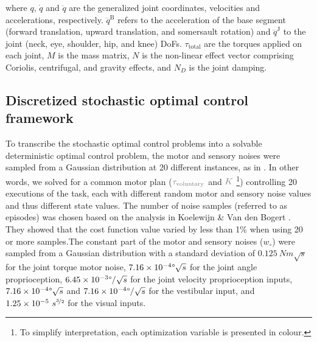 \documentclass[10pt,letterpaper]{article}
\begin{document}

\noindent where $q$, $\dot{q}$ and $\ddot{q}$ are the generalized joint coordinates, velocities and accelerations, respectively. $\ddot{q}^{\text{B}}$ refers to the acceleration of the base segment (forward translation, upward translation, and somersault rotation) and $\ddot{q}^{\text{J}}$ to the joint (neck, eye, shoulder, hip, and knee) DoFs. $\tau_{\text{total}}$ are the torques applied on each joint, $M$ is the mass matrix, $N$ is the non-linear effect vector comprising Coriolis, centrifugal, and gravity effects, and $N_D$ is the joint damping.

\subsection{Discretized stochastic optimal control framework}\label{subsec:methods_DSOCP}

To transcribe the stochastic optimal control problems into a solvable deterministic optimal control problem, the motor and sensory noises were sampled from a Gaussian distribution at 20 different instances, as in \cite{afschrift2018increased, koelewijn2020solution}.
In other words, we solved for a common motor plan ($\textcolor{gray}{\tau_{\text{voluntary}}}$ and $\textcolor{gray}{K}$ \footnote{To simplify interpretation, each optimization variable is presented in colour.}) controlling 20 executions of the task, each with different random motor and sensory noise values and thus different state values.
The number of noise samples (referred to as episodes) was chosen based on the analysis in Koelewijn \& Van den Bogert \cite{koelewijn2020solution}.
They showed that the cost function value varied by less than 1\% when using 20 or more samples.The constant part of the motor and sensory noises ($w_{\circ}$) were sampled from a Gaussian distribution with a standard deviation of $0.125~Nm\sqrt{s}$ for the joint torque motor noise, $\num{7.16e-4}\degree\sqrt{s}$ for the joint angle proprioception, $\num{6.45e-3}\degree/\sqrt{s}$ for the joint velocity proprioception inputs, $\num{7.16e-4}\degree\sqrt{s}$ and $\num{7.16e-4}\degree/\sqrt{s}$ for the vestibular input, and $\num{1.25e-5}~s^{\nicefrac{3}{2}}$ for the visual inputs. 
\end{document}
